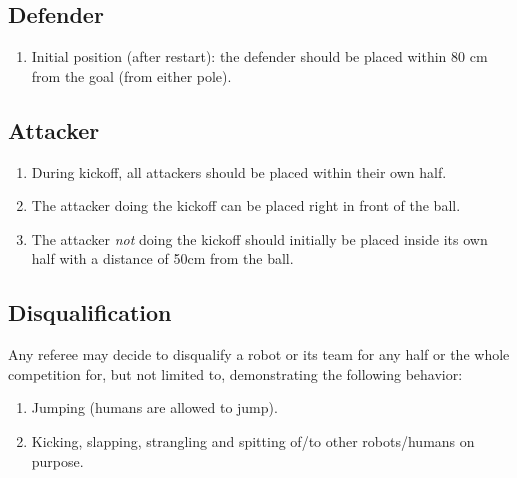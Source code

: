 \documentclass[a4paper, 12pt, oneside]{article}
\begin{document}
\subsection{Defender}

\begin{enumerate}
    \item Initial position (after restart): the defender should be placed within 80 cm from the goal (from either pole).
\end{enumerate}

\subsection{Attacker}

\begin{enumerate}
    \item During kickoff, all attackers should be placed within their own half.
    \item The attacker doing the kickoff can be placed right in front of the ball.
    \item The attacker \emph{not} doing the kickoff should initially be placed inside its own half with a distance of 50cm from the ball.
\end{enumerate}

\subsection{Disqualification}

Any referee may decide to disqualify a robot or its team for any half or the whole competition for, but not limited to, demonstrating the following behavior:
\begin{enumerate}
    \item Jumping (humans are allowed to jump).
    \item Kicking, slapping, strangling and spitting of/to other robots/humans on purpose.
\end{enumerate}
\end{document}
